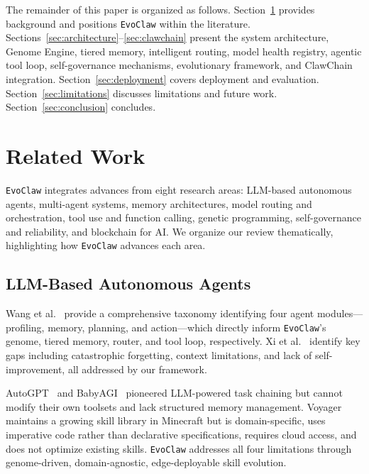\documentclass[conference]{IEEEtran}
\newcommand{\evoclaw}{\texttt{EvoClaw}\xspace}
\begin{document}
The remainder of this paper is organized as follows. Section~\ref{sec:related} provides background and positions \evoclaw{} within the literature. Sections~\ref{sec:architecture}--\ref{sec:clawchain} present the system architecture, Genome Engine, tiered memory, intelligent routing, model health registry, agentic tool loop, self-governance mechanisms, evolutionary framework, and ClawChain integration. Section~\ref{sec:deployment} covers deployment and evaluation. Section~\ref{sec:limitations} discusses limitations and future work. Section~\ref{sec:conclusion} concludes.



\section{Related Work}
\label{sec:related}

\evoclaw{} integrates advances from eight research areas: LLM-based autonomous agents, multi-agent systems, memory architectures, model routing and orchestration, tool use and function calling, genetic programming, self-governance and reliability, and blockchain for AI. We organize our review thematically, highlighting how \evoclaw{} advances each area.

\subsection{LLM-Based Autonomous Agents}

Wang et al.~\cite{wang2023survey} provide a comprehensive taxonomy identifying four agent modules---profiling, memory, planning, and action---which directly inform \evoclaw{}'s genome, tiered memory, router, and tool loop, respectively. Xi et al.~\cite{xi2023rise} identify key gaps including catastrophic forgetting, context limitations, and lack of self-improvement, all addressed by our framework.

AutoGPT~\cite{auto_gpt} and BabyAGI~\cite{babyagi} pioneered LLM-powered task chaining but cannot modify their own toolsets and lack structured memory management. Voyager~\cite{wang2023voyager} maintains a growing skill library in Minecraft but is domain-specific, uses imperative code rather than declarative specifications, requires cloud access, and does not optimize existing skills. \evoclaw{} addresses all four limitations through genome-driven, domain-agnostic, edge-deployable skill evolution.
\end{document}
